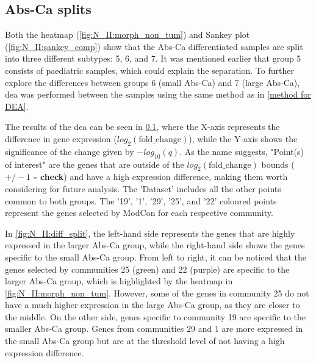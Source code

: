 \subsection{Abs-Ca splits} \label{s:N_II:diff_split}

Both the heatmap (\cref{fig:N_II:morph_non_tum}) and Sankey plot (\cref{fig:N_II:sankey_comp}) show that the Abs-Ca differentiated samples are split into three different subtypes: 5, 6, and 7. It was mentioned earlier that group 5 consists of paediatric samples, which could explain the separation. To further explore the differences between groups 6 (small Abs-Ca) and 7 (large Abs-Ca), \acrfull{dea} was performed between the samples using the same method as in \cref{method for DEA}.


The results of the \acrshort{dea} can be seen in \cref{s:N_II:diff_split}, where the X-axis represents the difference in gene expression ($log_2(\text{fold\_change})$), while the Y-axis shows the significance of the change given by $-log_{10}(q)$. As the name suggests, "Point(s) of interest" are the genes that are outside of the $log_2(\text{fold\_change})$ bounds (\textbf{$+/-1$ - check}) and have a high expression difference, making them worth considering for future analysis. The 'Dataset' includes all the other points common to both groups. The '19', '1', '29', '25', and '22' coloured points represent the genes selected by ModCon for each respective community.

In \cref{fig:N_II:diff_split}, the left-hand side represents the genes that are highly expressed in the larger Abs-Ca group, while the right-hand side shows the genes specific to the small Abs-Ca group. From left to right, it can be noticed that the genes selected by communities 25 (green) and 22 (purple) are specific to the larger Abs-Ca group, which is highlighted by the heatmap in \cref{fig:N_II:morph_non_tum}. However, some of the genes in community 25 do not have a much higher expression in the large Abs-Ca group, as they are closer to the middle. On the other side, genes specific to community 19 are specific to the smaller Abs-Ca group. Genes from communities 29 and 1 are more expressed in the small Abs-Ca group but are at the threshold level of not having a high expression difference.

